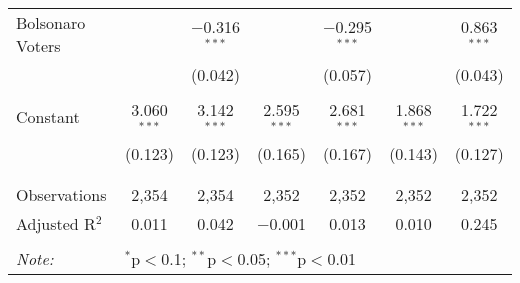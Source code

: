 \begin{table}[!htbp]
\begin{tabular}{@{\extracolsep{5pt}}lcccccc}
 Bolsonaro Voters &  & $-$0.316$^{***}$ &  & $-$0.295$^{***}$ &  & 0.863$^{***}$ \\ 
  &  & (0.042) &  & (0.057) &  & (0.043) \\ 
  & & & & & & \\ 
 Constant & 3.060$^{***}$ & 3.142$^{***}$ & 2.595$^{***}$ & 2.681$^{***}$ & 1.868$^{***}$ & 1.722$^{***}$ \\ 
  & (0.123) & (0.123) & (0.165) & (0.167) & (0.143) & (0.127) \\ 
  & & & & & & \\ 
\hline \\[-1.8ex] 
Observations & 2,354 & 2,354 & 2,352 & 2,352 & 2,352 & 2,352 \\ 
Adjusted R$^{2}$ & 0.011 & 0.042 & $-$0.001 & 0.013 & 0.010 & 0.245 \\ 
\hline 
\hline \\[-1.8ex] 
\textit{Note:}  & \multicolumn{6}{l}{$^{*}$p$<$0.1; $^{**}$p$<$0.05; $^{***}$p$<$0.01} \\ 
\end{tabular} 
\end{table} 
